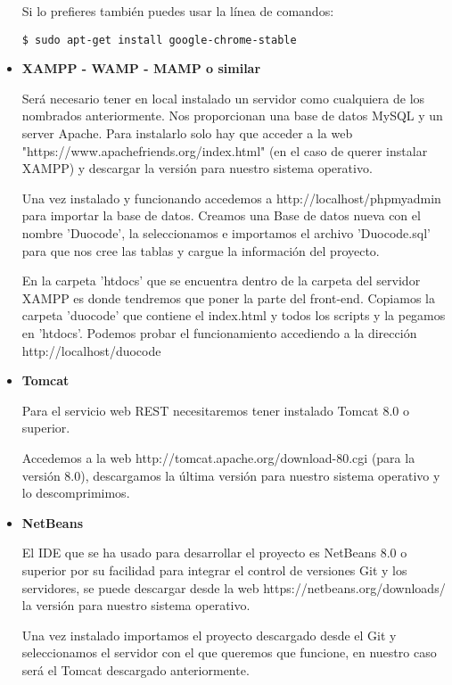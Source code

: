 \begin{itemize}
Si lo prefieres también puedes usar la línea de comandos:
{\codesize
\begin{verbatim}
$ sudo apt-get install google-chrome-stable
\end{verbatim}
}



\item \textbf{XAMPP - WAMP - MAMP o similar}

Será necesario tener en local instalado un servidor como cualquiera de los nombrados anteriormente. Nos proporcionan una base de datos MySQL y un server Apache.
Para instalarlo solo hay que acceder a la web "https://www.apachefriends.org/index.html" (en el caso de querer instalar XAMPP) y descargar la versión para nuestro sistema operativo.


Una vez instalado y funcionando accedemos a http://localhost/phpmyadmin  para importar la base de datos.
Creamos una Base de datos nueva con el nombre 'Duocode', la seleccionamos e importamos el archivo 'Duocode.sql' para que nos cree las tablas y cargue la información del proyecto.


En la carpeta 'htdocs' que se encuentra dentro de la carpeta del servidor XAMPP es donde tendremos que poner la parte del front-end.
Copiamos la carpeta 'duocode' que contiene el index.html y todos los scripts y la pegamos en 'htdocs'.
Podemos probar el funcionamiento accediendo a la dirección http://localhost/duocode



\item \textbf{Tomcat}

Para el servicio web REST necesitaremos tener instalado Tomcat 8.0 o superior.

Accedemos a la web http://tomcat.apache.org/download-80.cgi (para la versión 8.0), descargamos la última versión para nuestro sistema operativo y lo descomprimimos.



\item \textbf{NetBeans}

El IDE que se ha usado para desarrollar el proyecto es NetBeans 8.0 o superior por su facilidad para integrar el control de versiones Git y los servidores, se puede descargar desde la web https://netbeans.org/downloads/ la versión para nuestro sistema operativo.

Una vez instalado importamos el proyecto descargado desde el Git y seleccionamos el servidor con el que queremos que funcione, en nuestro caso será el Tomcat descargado anteriormente.


\end{itemize}
